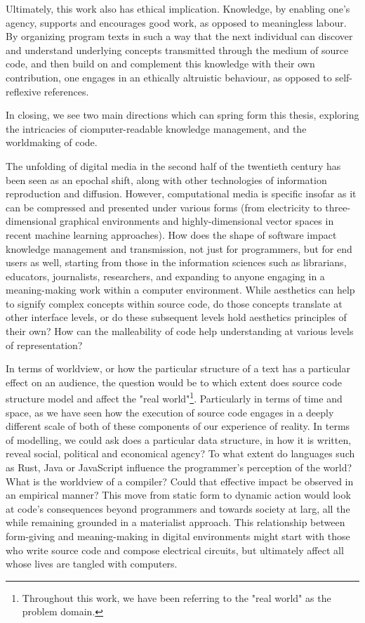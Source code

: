 Ultimately, this work also has ethical implication. Knowledge, by enabling one's agency, supports and encourages good work, as opposed to meaningless labour. By organizing program texts in such a way that the next individual can discover and understand underlying concepts transmitted through the medium of source code, and then build on and complement this knowledge with their own contribution, one engages in an ethically altruistic behaviour, as opposed to self-reflexive references.

\spacer

In closing, we see two main directions which can spring form this thesis, exploring the intricacies of ciomputer-readable knowledge management, and the worldmaking of code.

The unfolding of digital media in the second half of the twentieth century has been seen as an epochal shift, along with other technologies of information reproduction and diffusion. However, computational media is specific insofar as it can be compressed and presented under various forms (from electricity to three-dimensional graphical environments and highly-dimensional vector spaces in recent machine learning approaches). How does the shape of software impact knowledge management and transmission, not just for programmers, but for end users as well, starting from those in the information sciences such as librarians, educators, journalists, researchers, and expanding to anyone engaging in a meaning-making work within a computer environment. While aesthetics can help to signify complex concepts within source code, do those concepts translate at other interface levels, or do these subsequent levels hold aesthetics principles of their own? How can the malleability of code help understanding at various levels of representation?

In terms of worldview, or how the particular structure of a text has a particular effect on an audience, the question would be to which extent does source code structure model and affect the "real world"\footnote{Throughout this work, we have been referring to the "real world" as the problem domain.}. Particularly in terms of  time and space, as we have seen how the execution of source code engages in a deeply different scale of both of these components of our experience of reality. In terms of modelling, we could ask does a particular data structure, in how it is written, reveal social, political and economical agency? To what extent do languages such as Rust, Java or JavaScript influence the programmer's perception of the world? What is the worldview of a compiler? Could that effective impact be observed in an empirical manner? This move from static form to dynamic action would look at code's consequences beyond programmers and towards society at larg, all the while remaining grounded in a materialist approach. This relationship between form-giving and meaning-making in digital environments might start with those who write source code and compose electrical circuits, but ultimately affect all whose lives are tangled with computers.
